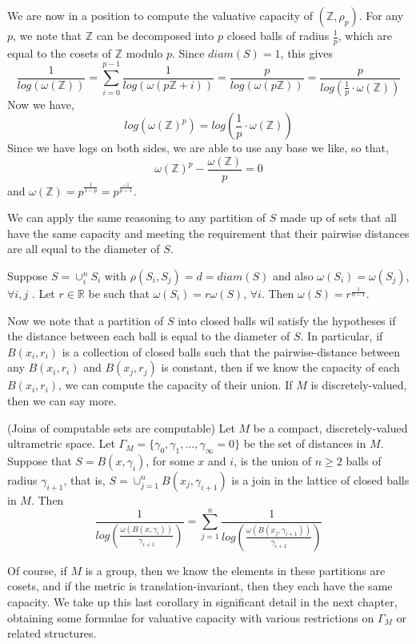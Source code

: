 \begin{example}
We are now in a position to compute the valuative capacity of $(\mathbb{Z}, \rho_p)$. For any $p$, we note that $\mathbb{Z}$ can be decomposed into $p$ closed balls of radius $\frac{1}{p}$, which are equal to the cosets of $\mathbb{Z}$ modulo $p$. Since $diam(S)=1$, this gives 
\[\frac{1}{log(\omega(\mathbb{Z}))} = \sum_{i=0}^{p-1} \frac{1}{log(\omega(p\mathbb{Z} +i))} = \frac{p}{log(\omega(p\mathbb{Z}))} = \frac{p}{log(\frac{1}{p} \cdot \omega(\mathbb{Z}))}\]
Now we have,
\[log(\omega(\mathbb{Z})^p) = log(\frac{1}{p} \cdot\omega(\mathbb{Z}))\]
Since we have logs on both sides, we are able to use any base we like, so that,
\[\omega(\mathbb{Z})^p - \frac{\omega(\mathbb{Z})}{p} = 0 \]
and $\omega(\mathbb{Z})= p^{\frac{1}{1-p}}=p^{\frac{-1}{p-1}}$.
\end{example}

We can apply the same reasoning to any partition of $S$ made up of sets that all have the same capacity and meeting the requirement that their pairwise distances are all equal to the diameter of $S$.\\

\begin{corollary}
\label{semiregular}
	Suppose $S = \cup_i^n S_i$ with $\rho(S_i, S_j)=d=diam(S)$ and also $\omega(S_i)=\omega(S_j)$, $\forall i,j$ .  Let $r \in \mathbb{R}$ be such that $\omega(S_i)=r\omega(S)$, $\forall i$. Then $\omega(S) = r^{\frac{1}{n-1}}$. 
\end{corollary}

Now we note that a partition of $S$ into closed balls wil satisfy the hypotheses if the distance between each ball is equal to the diameter of $S$. In particular, if $B(x_i,r_i)$ is a collection of closed balls such that the pairwise-distance between any $B(x_i,r_i)$ and $B(x_j,r_j)$ is constant, then if we know the capacity of each $B(x_i,r_i)$, we can compute the capacity of their union. If $M$ is discretely-valued, then we can say more.\\ 
\begin{corollary}
	(Joins of computable sets are computable) Let $M$ be a compact, discretely-valued ultrametric space. Let $\Gamma_M = \{\gamma_0, \gamma_1,\ldots, \gamma_\infty=0\}$ be the set of distances in $M$. Suppose that $S = B(x, \gamma_i)$,  for some $x$ and $i$, is the union of $n \geq 2$ balls of radius $\gamma_{i+1}$, that is, $S=\cup_{j=1}^n B(x_j, \gamma_{i+1})$ is a join in the lattice of closed balls in $M$. Then 
	\[\frac{1}{log(\frac{\omega(B(x, \gamma_i))}{\gamma_{i+1}} )} = \sum_{j=1}^n \frac{1}{log(\frac{\omega(B(x_j, \gamma_{i+1}))}{\gamma_{i+1} })}\]
\end{corollary}

Of course, if $M$ is a group, then we know the elements in these partitions are cosets, and if the metric is translation-invariant, then they each have the same capacity. We take up this last corollary in significant detail in the next chapter, obtaining some formulae for valuative capacity with various restrictions on $\Gamma_M$ or related structures.